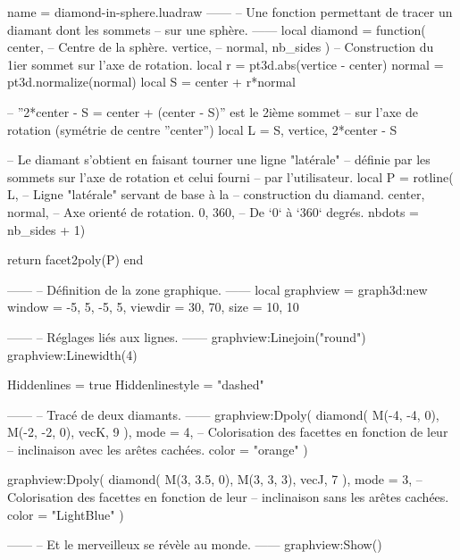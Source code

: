 \documentclass{standalone}
\begin{document}
\begin{luadraw}{name = diamond-in-sphere.luadraw}
------
-- Une fonction permettant de tracer un diamant dont les sommets
-- sur une sphère.
------
local diamond = function(
  center,   -- Centre de la sphère.
  vertice,  --
  normal,
  nb_sides
)
-- Construction du 1ier sommet sur l'axe de rotation.
  local r = pt3d.abs(vertice - center)
  normal  = pt3d.normalize(normal)
  local S = center + r*normal

-- ''2*center - S = center + (center - S)'' est le 2ième sommet
-- sur l'axe de rotation (symétrie de centre ''center'')
  local L = {S, vertice, 2*center - S}

-- Le diamant s'obtient en faisant tourner une ligne "latérale"
-- définie par les sommets sur l'axe de rotation et celui fourni
-- par l'utilisateur.
  local P = rotline(
    L,                 -- Ligne "latérale" servant de base à la
                       -- construction du diamand.
    {center, normal},  -- Axe orienté de rotation.
    0, 360,            -- De `0` à `360` degrés.
    {nbdots = nb_sides + 1})

  return facet2poly(P)
end

------
-- Définition de la zone graphique.
------
local graphview = graph3d:new{
  window  = {-5, 5, -5, 5},
  viewdir = {30, 70},
  size    = {10, 10}
}

------
-- Réglages liés aux lignes.
------
graphview:Linejoin("round")
graphview:Linewidth(4)

Hiddenlines     = true
Hiddenlinestyle = "dashed"

------
-- Tracé de deux diamants.
------
graphview:Dpoly(
  diamond(
    M(-4, -4, 0), M(-2, -2, 0), vecK,
    9
  ),
  {
    mode  = 4,  -- Colorisation des facettes en fonction de leur
                -- inclinaison avec les arêtes cachées.
    color = "orange"
  })

graphview:Dpoly(
  diamond(
    M(3, 3.5, 0), M(3, 3, 3), vecJ,
    7
  ),
  {
    mode  = 3,  -- Colorisation des facettes en fonction de leur
                -- inclinaison sans les arêtes cachées.
    color = "LightBlue"
  })

------
-- Et le merveilleux se révèle au monde.
------
graphview:Show()
\end{luadraw}
\end{document}
